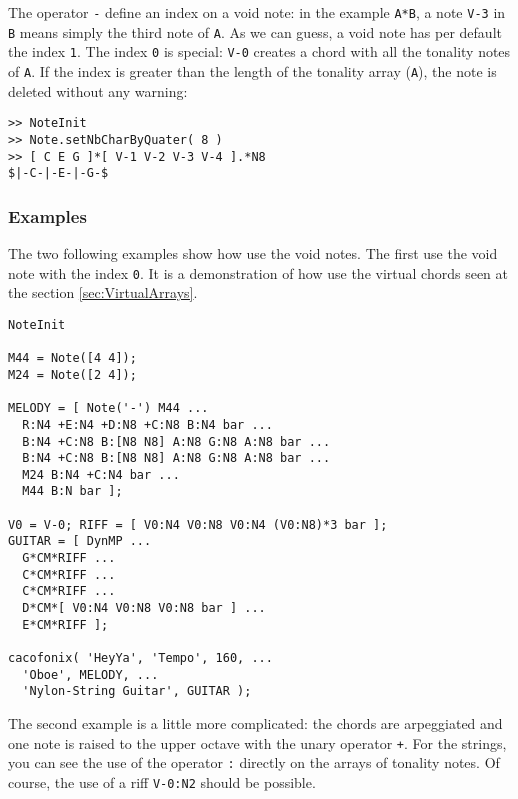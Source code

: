 \documentclass{article}
\begin{document}
The operator \lstinline!-! define an index on a void note: in the example \lstinline!A*B!, a note \lstinline!V-3! in \lstinline!B! means simply the third note of \lstinline!A!. As we can guess, a void note has per default the index \lstinline!1!. The index \lstinline!0! is special: \lstinline!V-0! creates a chord with all the tonality notes of \lstinline!A!. If the index is greater than the length of the tonality array (\lstinline!A!), the note is deleted without any warning:
\begin{lstlisting}
>> NoteInit
>> Note.setNbCharByQuater( 8 )
>> [ C E G ]*[ V-1 V-2 V-3 V-4 ].*N8
$|-C-|-E-|-G-$
\end{lstlisting}

\subsubsection{Examples}
\label{sec:voidExamples}

The two following examples show how use the void notes. The first use the void note with the index \lstinline!0!. It is a demonstration of how use the virtual chords seen at the section \ref{sec:VirtualArrays}.


\begin{lstlisting}
NoteInit

M44 = Note([4 4]);
M24 = Note([2 4]);

MELODY = [ Note('-') M44 ...
  R:N4 +E:N4 +D:N8 +C:N8 B:N4 bar ...
  B:N4 +C:N8 B:[N8 N8] A:N8 G:N8 A:N8 bar ...
  B:N4 +C:N8 B:[N8 N8] A:N8 G:N8 A:N8 bar ...
  M24 B:N4 +C:N4 bar ...
  M44 B:N bar ];

V0 = V-0; RIFF = [ V0:N4 V0:N8 V0:N4 (V0:N8)*3 bar ];
GUITAR = [ DynMP ...
  G*CM*RIFF ...
  C*CM*RIFF ...
  C*CM*RIFF ...
  D*CM*[ V0:N4 V0:N8 V0:N8 bar ] ...
  E*CM*RIFF ];

cacofonix( 'HeyYa', 'Tempo', 160, ...
  'Oboe', MELODY, ...
  'Nylon-String Guitar', GUITAR );
\end{lstlisting}

The second example is a little more complicated: the chords are arpeggiated and one note is raised to the upper octave with the unary operator \lstinline!+!. For the strings, you can see the use of the operator \lstinline!:! directly on the arrays of tonality notes. Of course, the use of a riff \lstinline!V-0:N2! should be possible.
\end{document}
